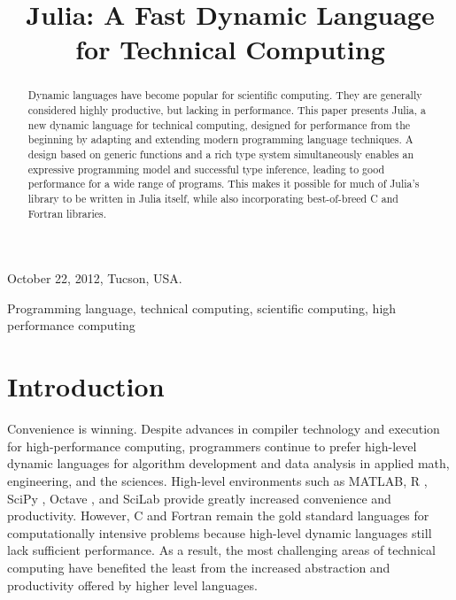 \documentclass[9pt]{sigplanconf}
\newcommand{\Matlab}{MATLAB\textsuperscript{\tiny\textregistered}}
\begin{document}
               {October 22, 2012, Tucson, USA.}


\title{Julia: A Fast Dynamic Language for Technical Computing}


\maketitle
\begin{abstract}
  Dynamic languages have become popular for scientific computing. They
  are generally considered highly productive, but lacking in performance.
  This paper presents Julia, a new dynamic language for technical
  computing, designed for performance from the beginning by adapting and
  extending modern programming language techniques. A design based on
  generic functions and a rich type system simultaneously enables an
  expressive programming model and successful type inference, leading to
  good performance for a wide range of programs. This makes it possible
  for much of Julia's library to be written in Julia itself, while also
  incorporating best-of-breed C and Fortran libraries.
\end{abstract}



\keywords
Programming language, technical computing, scientific computing, high
performance computing

\section{Introduction}

Convenience is winning. Despite advances in compiler technology and
execution for high-performance computing, programmers continue to prefer
high-level dynamic languages for algorithm development and data analysis
in applied math, engineering, and the sciences. High-level environments
such as \Matlab, R \cite{Rlang}, SciPy \cite{numpy}, Octave \cite{Octave},
and SciLab \cite{scilab} provide greatly increased convenience and
productivity. However, C and Fortran remain the gold standard languages
for computationally intensive problems because high-level dynamic
languages still lack sufficient performance. As a result, the most
challenging areas of technical computing have benefited the least from the
increased abstraction and productivity offered by higher level languages.
\end{document}
